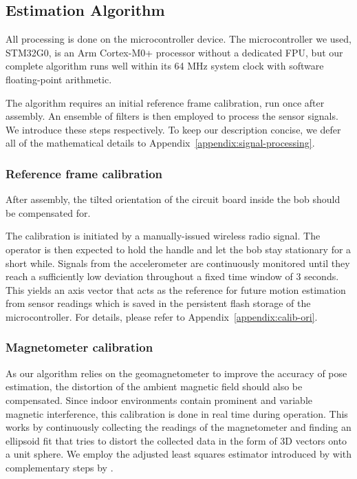 \documentclass{nime-alternate} %
\begin{document}
\subsection{Estimation Algorithm}
All processing is done on the microcontroller device. The microcontroller we used, STM32G0, is an Arm Cortex-M0+ processor without a dedicated FPU, but our complete algorithm runs well within its 64 MHz system clock with software floating-point arithmetic.

The algorithm requires an initial reference frame calibration, run once after assembly. An ensemble of filters is then employed to process the sensor signals. We introduce these steps respectively. To keep our description concise, we defer all of the mathematical details to Appendix~\ref{appendix:signal-processing}.

\subsubsection{Reference frame calibration}
After assembly, the tilted orientation of the circuit board inside the bob should be compensated for.

The calibration is initiated by a manually-issued wireless radio signal. The operator is then expected to hold the handle and let the bob stay stationary for a short while. Signals from the accelerometer are continuously monitored until they reach a sufficiently low deviation throughout a fixed time window of 3 seconds. This yields an axis vector that acts as the reference for future motion estimation from sensor readings which is saved in the persistent flash storage of the microcontroller. For details, please refer to Appendix~\ref{appendix:calib-ori}.

\subsubsection{Magnetometer calibration}
As our algorithm relies on the geomagnetometer to improve the accuracy of pose estimation, the distortion of the ambient magnetic field should also be compensated. Since indoor environments contain prominent and variable magnetic interference, this calibration is done in real time during operation. This works by continuously collecting the readings of the magnetometer and finding an ellipsoid fit that tries to distort the collected data in the form of 3D vectors onto a unit sphere. We employ the adjusted least squares estimator introduced by \cite{Markovsky_2004_ALS} with complementary steps by \cite{Renaudin2010}.
\end{document}
